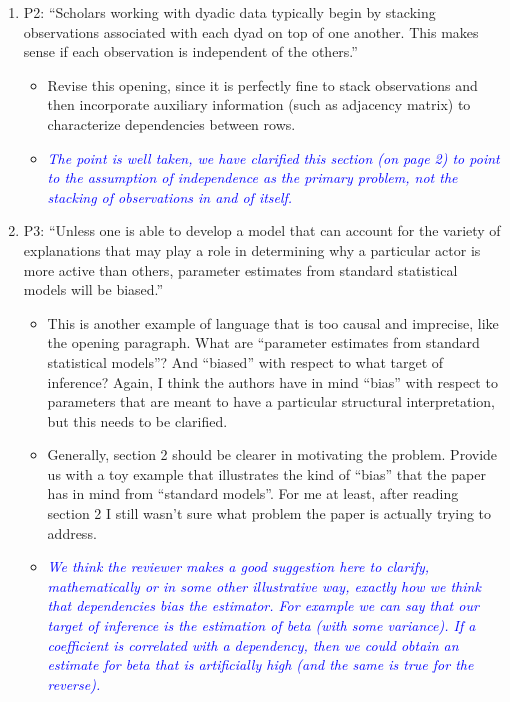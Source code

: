 \begin{enumerate}
\begin{itemize}
	\end{itemize}
	\item P2: “Scholars working with dyadic data typically begin by stacking observations associated with each dyad on top of one another. This makes sense if each observation is independent of the others.”
	\begin{itemize}
		\item Revise this opening, since it is perfectly fine to stack observations and then incorporate auxiliary information (such as adjacency matrix) to characterize dependencies between rows.
	\end{itemize}
	\begin{itemize}
		\item {\emph{\textcolor{blue}{
		 The point is well taken, we have clarified this section (on page 2) to point to the assumption of independence as the primary problem, not the stacking of observations in and of itself.
		}}}
	\end{itemize}
	\item P3: “Unless one is able to develop a model that can account for the variety of explanations that may play a role in determining why a particular actor is more active than others, parameter estimates from standard statistical models will be biased.”
	\begin{itemize}
		\item This is another example of language that is too causal and imprecise, like the opening paragraph. What are “parameter estimates from standard statistical models”?  And “biased” with respect to what target of inference? Again, I think the authors have in mind “bias” with respect to parameters that are meant to have a particular structural interpretation, but this needs to be clarified.
		\item Generally, section 2 should be clearer in motivating the problem.  Provide us with a toy example that illustrates the kind of “bias” that the paper has in mind from “standard models”.  For me at least, after reading section 2 I still wasn’t sure what problem the paper is actually trying to address.
		\item \textcolor{blue}{ \emph{ We think the reviewer makes a good suggestion here to clarify, mathematically or in some other illustrative way, exactly how we think that dependencies bias the estimator. For example we can say that our target of inference is the estimation of beta (with some variance). If a coefficient is correlated with a dependency, then we could obtain an estimate for beta that is artificially high (and the same is true for the reverse).
}}
\end{itemize}
\end{enumerate}
